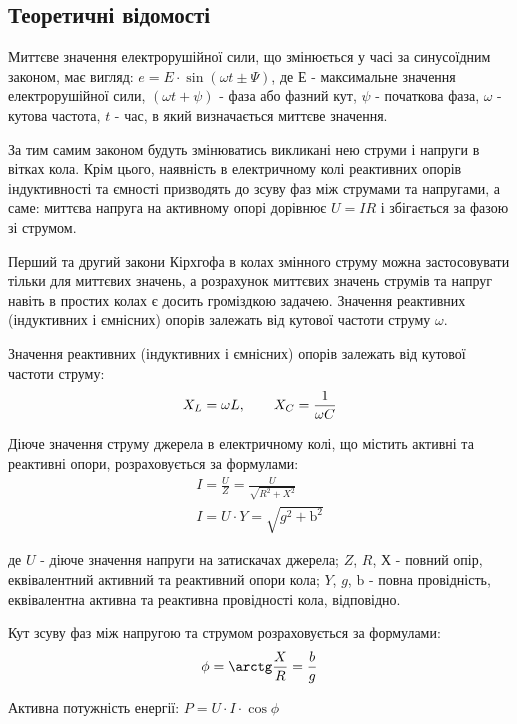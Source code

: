 \documentclass{article}
\begin{document}
\begin{normalsize}
	\section*{Теоретичні відомості}
	Миттєве значення електрорушійної сили, що змінюється у часі за
	синусоїдним законом, має вигляд: $e=E\cdot\sin(\omega t\pm\Psi)$, де Е - максимальне	значення електрорушійної сили, $(\omega t+\psi)$ - фаза або фазний кут, $\psi$ - початкова фаза, $\omega$ - кутова частота, $t$ - час, в який визначається миттєве значення.
	
	За тим самим законом будуть змінюватись викликані нею струми і напруги
	в вітках кола. Крім цього, наявність в електричному колі реактивних опорів
	індуктивності та ємності призводять до зсуву фаз між струмами та напругами, а
	саме: миттєва напруга на активному опорі дорівнює $U=IR$ і збігається за фазою зі
	струмом.
	
	Перший та другий закони Кірхгофа в колах змінного струму можна
	застосовувати тільки для миттєвих значень, а розрахунок миттєвих значень
	струмів та напруг навіть в простих колах є досить громіздкою задачею.
	Значення реактивних (індуктивних і ємнісних) опорів залежать від
	кутової частоти струму $\omega$.
	
	Значення реактивних (індуктивних і ємнісних) опорів залежать від кутової
	частоти струму:
	\begin{gather}
		X_L=\omega L,\hspace{20px} X_C=\frac{1}{\omega C}\nonumber
	\end{gather}

	Діюче значення струму джерела в електричному колі, що містить активні та
	реактивні опори, розраховується за формулами:
	\begin{gather}
		I=\frac{U}{Z}=\frac{U}{\sqrt{R^2+X^2}}\nonumber\\
		I=U\cdot Y=\sqrt{g^2+\text{b}^2}\nonumber
	\end{gather}

	де $U$ - діюче значення напруги на затискачах джерела; $Z$, $R$, $Х$ -
	повний опір, еквівалентний активний та реактивний опори кола; $Y$, $g$, $\text{b}$ - повна провідність, еквівалентна активна та реактивна провідності кола,
	відповідно.
	
	Кут зсуву фаз між напругою та струмом розраховується за формулами:
	\begin{gather}
		\phi=\arctg\frac{X}{R}=\frac{b}{g}\nonumber
	\end{gather}

	Активна потужність енергії: $P=U\cdot I\cdot\cos\phi$
	

\end{normalsize}
\end{document}
